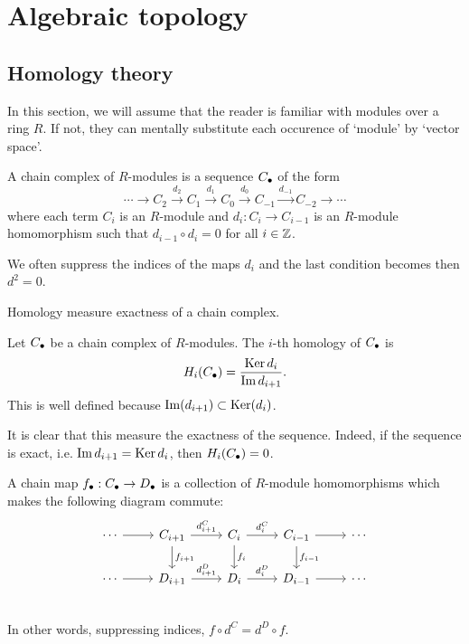 \section*{Algebraic topology}
\subsection*{Homology theory}
In this section, we will assume that the reader is familiar with modules over a ring $R$. If not, they can mentally substitute each occurence of `module' by `vector space'.

\begin{definition}
    A chain complex of $R$-modules is a sequence $C_\bullet$ of the form
    \[
    \cdots \to  C_2 \xrightarrow{d_2}  C_1 \xrightarrow{d_1} C_0 \xrightarrow{d_0} C_{-1} \xrightarrow{d_{-1}}   C_{-2} \to  \cdots
    \] 
    where each term $C_i$ is an $R$-module and $d_i: C_i \to  C_{i-1}$ is an $R$-module homomorphism such that $d_{i-1}  \circ  d_i = 0$  for all $i \in \mathbb{Z}$.
\end{definition}
We often suppress the indices of the maps $d_i$ and the last condition becomes then  $d^2 = 0$.

\begin{marginfigure}
    \centering
    \caption{Homology measure exactness of a chain complex.}
    \label{fig:homology-definition}
\end{marginfigure}

\begin{definition}[Homology]
    Let $C_\bullet$ be a chain complex of  $R$-modules. The $i$-th homology of $C_\bullet$ is
     \[
         H_i(C_\bullet) = \frac{\operatorname{Ker} d_i}{\operatorname{Im} d_{i+1}}
    .\] 
    This is well defined because $\operatorname{Im}(d_{i+1}) \subset \operatorname{Ker} (d_i)$.
\end{definition}
It is clear that this measure the exactness of the sequence. Indeed, if the sequence is exact, i.e. $\operatorname{Im} d_{i+1} = \operatorname{Ker} d_i$, then $H_i(C_\bullet) = 0$.


\begin{definition}
    A chain map $f_\bullet: C_\bullet \to  D_\bullet$ is a collection of $R$-module homomorphisms which makes the following diagram commute:
    \[
        \begin{tikzcd}
            \cdots  \arrow[r, ""]&
            C_{i+1} \arrow[r, "d_{i+1}^{C}"] \arrow[d, "f_{i+1}"]&
            C_{i} \arrow[r, "d_{i}^{C}"] \arrow[d, "f_i"]&
            C_{i-1} \arrow[r, ""] \arrow[d, "f_{i-1}"]&
            \cdots \\
            \cdots  \arrow[r, ""]&
            D_{i+1} \arrow[r, "d_{i+1}^{D}"] &
            D_{i} \arrow[r, "d_{i}^{D}"] &
            D_{i-1} \arrow[r, ""] &
            \cdots \\
        \end{tikzcd}
    \]
    In other words, suppressing indices, $f  \circ  d^{C} = d^{D}  \circ f$.
\end{definition}


